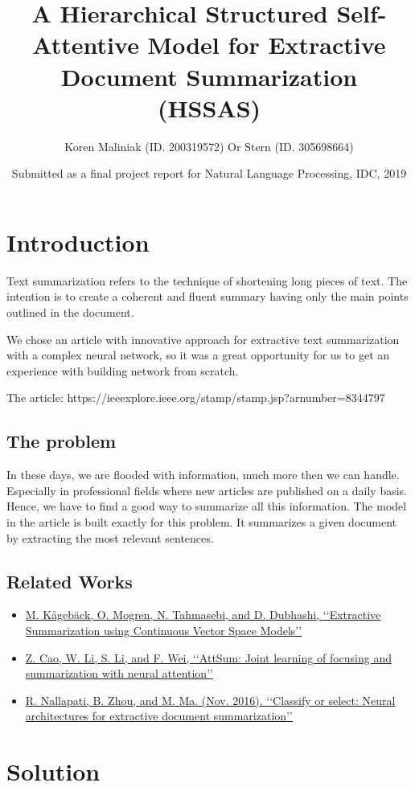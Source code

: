 \documentclass{article}
\title{A Hierarchical Structured Self-Attentive Model for Extractive Document Summarization (HSSAS)}
\author{Koren Maliniak (ID. 200319572)
Or Stern (ID. 305698664)}
\date{Submitted as a final project report for Natural Language Processing, IDC, 2019}
\begin{document}
\maketitle

\section{Introduction}
Text summarization refers to the technique of shortening long pieces of text. The intention is to create a coherent and fluent summary having only the main points outlined in the document.

We chose an article with innovative approach for extractive text summarization with a complex neural network, so it was a great opportunity for us to get an experience with building network from scratch.

The article: https://ieeexplore.ieee.org/stamp/stamp.jsp?arnumber=8344797

\subsection{The problem}
In these days, we are flooded with information, much more then we can handle. Especially in professional fields where new articles are published on a daily basis. Hence, we have to find a good way to summarize all this information.
The model in the article is built exactly for this problem. It summarizes a given document by extracting the most relevant sentences.

\subsection{Related Works}
\begin{itemize}
    \item \href{https://www.aclweb.org/anthology/W14-1504}{M. Kågebäck, O. Mogren, N. Tahmasebi, and D. Dubhashi, ‘‘Extractive
Summarization using Continuous Vector Space Models’’}
    \item \href{https://www.aclweb.org/anthology/C16-1053}{Z. Cao, W. Li, S. Li, and F. Wei, ‘‘AttSum: Joint learning of focusing and
summarization with neural attention’’}
    \item \href{https://arxiv.org/pdf/1611.04244.pdf}{R. Nallapati, B. Zhou, and M. Ma. (Nov. 2016). ‘‘Classify or select:
Neural architectures for extractive document summarization’’}
\end{itemize}

\section{Solution}
\end{document}
